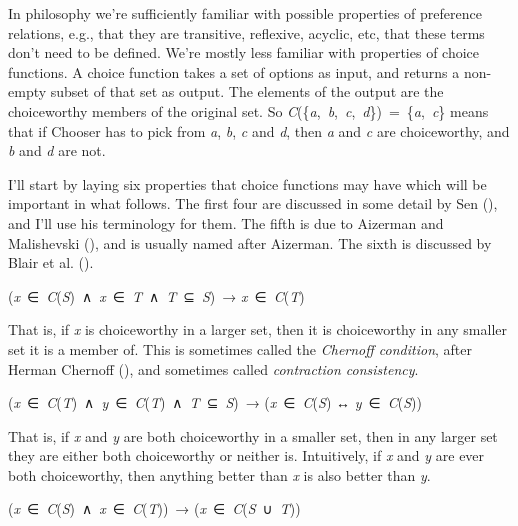 \documentclass[
  11pt,
  letterpaper,
  DIV=11,
  numbers=noendperiod,
  twoside]{scrartcl}
\providecommand{\tightlist}{%
  \setlength{\itemsep}{0pt}\setlength{\parskip}{0pt}}
\begin{document}
In philosophy we're sufficiently familiar with possible properties of
preference relations, e.g., that they are transitive, reflexive,
acyclic, etc, that these terms don't need to be defined. We're mostly
less familiar with properties of choice functions. A choice function
takes a set of options as input, and returns a non-empty subset of that
set as output. The elements of the output are the choiceworthy members
of the original set. So
\emph{C}(\{\emph{a},~\emph{b},~\emph{c},~\emph{d}\})~=~\{\emph{a},~\emph{c}\}
means that if Chooser has to pick from \emph{a}, \emph{b}, \emph{c} and
\emph{d}, then \emph{a} and \emph{c} are choiceworthy, and \emph{b} and
\emph{d} are not.

I'll start by laying six properties that choice functions may have which
will be important in what follows. The first four are discussed in some
detail by Sen (), and I'll use
his terminology for them. The fifth is due to Aizerman and Malishevski
(), and is usually named after
Aizerman. The sixth is discussed by Blair et al.
().

\begin{description}
\tightlist
\item[Property α]
(\emph{x}~∈~\emph{C}(\emph{S})~∧~\emph{x}~∈~\emph{T}~∧~\emph{T}~⊆~\emph{S})~→
\emph{x}~∈~\emph{C}(\emph{T})
\end{description}

That is, if \emph{x} is choiceworthy in a larger set, then it is
choiceworthy in any smaller set it is a member of. This is sometimes
called the \emph{Chernoff condition}, after Herman Chernoff
(), and sometimes called
\emph{contraction consistency}.

\begin{description}
\tightlist
\item[Property β]
(\emph{x}~∈~\emph{C}(\emph{T})~∧~\emph{y}~∈~\emph{C}(\emph{T})~∧~\emph{T}~⊆~\emph{S})~→
(\emph{x}~∈~\emph{C}(\emph{S}) ↔ \emph{y}~∈~\emph{C}(\emph{S}))
\end{description}

That is, if \emph{x} and \emph{y} are both choiceworthy in a smaller
set, then in any larger set they are either both choiceworthy or neither
is. Intuitively, if \emph{x} and \emph{y} are ever both choiceworthy,
then anything better than \emph{x} is also better than \emph{y}.

\begin{description}
\tightlist
\item[Property γ]
(\emph{x}~∈~\emph{C}(\emph{S})~∧~\emph{x}~∈~\emph{C}(\emph{T}))~→
(\emph{x}~∈~\emph{C}(\emph{S}~∪~\emph{T}))
\end{description}
\end{document}
